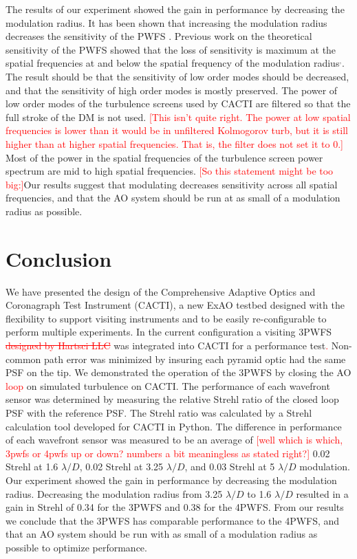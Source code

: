 \documentclass[12pt]{spieman}  %
\newcommand{\jrmadd}[1]{\textcolor{red}{#1}}
\newcommand{\jrmrmv}[1]{\textcolor{red}{\sout{#1}}}
\newcommand{\jrmcom}[1]{\textcolor{red}{[#1]}}
\begin{document}
\begin{spacing}{2}
The results of our experiment showed the gain in performance by decreasing the modulation radius. It has been shown that increasing the modulation radius decreases the sensitivity of the PWFS \cite{correia2020performance}. Previous work on the theoretical sensitivity of the PWFS showed that the loss of sensitivity is maximum at the spatial frequencies at and below the spatial frequency of the modulation radius\cite{guyon2005}$^,$\cite{verinaud2004nature}. The result should be that the sensitivity of low order modes should be decreased, and that the sensitivity of high order modes is mostly preserved. The power of low order modes of the turbulence screens used by CACTI are filtered so that the full stroke of the DM is not used. \jrmcom{This isn't quite right.  The power at low spatial frequencies is lower than it would be in unfiltered Kolmogorov turb, but it is still higher than at higher spatial frequencies.  That is, the filter does not set it to 0.} Most of the power in the spatial frequencies of the turbulence screen power spectrum are mid to high spatial frequencies. \jrmcom{So this statement might be too big:}Our results suggest that modulating decreases sensitivity across all spatial frequencies, and that the AO system should be run at as small of a modulation radius as possible. 



\section{Conclusion}

We have presented the design of the Comprehensive Adaptive Optics and Coronagraph Test Instrument (CACTI), a new ExAO testbed designed with the flexibility to support visiting instruments and to be easily re-configurable to perform multiple experiments. In the current configuration a visiting 3PWFS \jrmrmv{designed by Hartsci LLC} was integrated into CACTI for a performance test\jrmadd{.} Non-common path error was minimized by insuring each pyramid optic had the same PSF on the tip. We demonstrated the operation of the 3PWFS by closing the AO \jrmadd{loop} on simulated turbulence on CACTI. The performance of each wavefront sensor was determined by measuring the relative Strehl ratio of the closed loop PSF with the reference PSF. The Strehl ratio was calculated by a Strehl calculation tool developed for CACTI in Python. The difference in performance of each wavefront sensor was measured to be an average of \jrmcom{well which is which, 3pwfs or 4pwfs up or down?  numbers a bit meaningless as stated right?} 0.02 Strehl at 1.6 $\lambda/D$, 0.02 Strehl at 3.25 $\lambda/D$, and 0.03 Strehl at 5 $\lambda/D$ modulation. Our experiment showed the gain in performance by decreasing the modulation radius. Decreasing the modulation radius from 3.25 $\lambda/D$ to  1.6 $\lambda/D$ resulted in a gain in Strehl of 0.34 for the 3PWFS and 0.38 for the 4PWFS. From our results we conclude that the 3PWFS has comparable performance to the 4PWFS, and that an AO system should be run with as small of a modulation radius as possible to optimize performance. 







\end{spacing}
\end{document}
